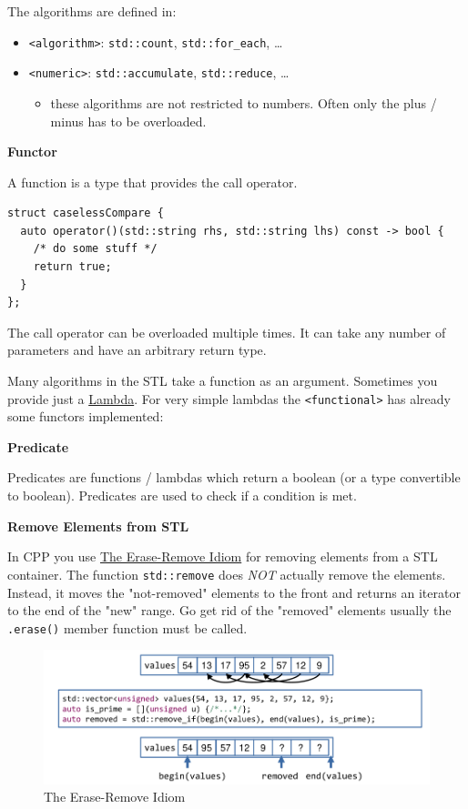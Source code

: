 \documentclass[11pt,twoside,landscape]{article}
\begin{document}
\begin{multicols}{3}
The algorithms are defined in:
\begin{itemize}
\item \texttt{<algorithm>}: \texttt{std::count}, \texttt{std::for\_each}, \ldots{}
\item \texttt{<numeric>}: \texttt{std::accumulate}, \texttt{std::reduce}, \ldots{}
\begin{itemize}
\item these algorithms are not restricted to numbers.
Often only the plus / minus has to be overloaded.
\end{itemize}
\end{itemize}

\textbf{Functor}

A function is a type that provides the call operator.
\lstset{language=c++,label= ,caption= ,captionpos=b,numbers=none}
\begin{lstlisting}
struct caselessCompare {
  auto operator()(std::string rhs, std::string lhs) const -> bool {
    /* do some stuff */ 
    return true;
  }
};
\end{lstlisting}

The call operator can be overloaded multiple times.
It can take any number of parameters and have an arbitrary return type.

Many algorithms in the STL take a function as an argument.
Sometimes you provide just a \href{../../../roam/20211008125556-lambda.org}{Lambda}.
For very simple lambdas the \texttt{<functional>} has already some functors implemented:

\textbf{Predicate}

Predicates are functions / lambdas which return a boolean (or a type convertible to boolean).
Predicates are used to check if a condition is met.

\textbf{Remove Elements from STL}

In CPP you use \href{../../../roam/20211221184236-the_erase_remove_idiom.org}{The Erase-Remove Idiom} for removing elements from a STL container.
The function \texttt{std::remove} does \emph{NOT} actually remove the elements.
Instead, it moves the "not-removed" elements to the front and returns an iterator to the end of the "new" range.
Go get rid of the "removed" elements usually the \texttt{.erase()} member function must be called.


\begin{figure}[htbp]
\centering
\includegraphics[width=.9\linewidth]{img/erase_remove_idiom.png}
\caption{The Erase-Remove Idiom}
\end{figure}



\end{multicols}
\end{document}
